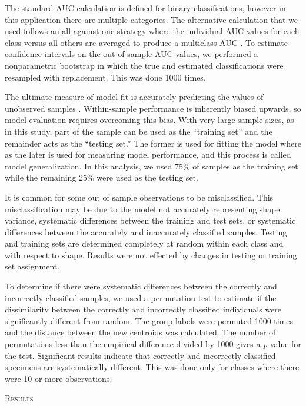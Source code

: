 \documentclass[12pt,letterpaper]{article}
\renewcommand{\section}[1]{%
\bigskip
\begin{center}
\begin{Large}
\normalfont\scshape #1
\medskip
\end{Large}
\end{center}}
\begin{document}
The standard AUC calculation is defined for binary classifications, however in this application there are multiple categories. The alternative calculation that we used follows an all-against-one strategy where the individual AUC values for each class versus all others are averaged to produce a multiclass AUC \citep{Hand2001}. To estimate confidence intervals on the out-of-sample AUC values, we performed a nonparametric bootstrap in which the true and estimated classifications were resampled with replacement. This was done 1000 times.

The ultimate measure of model fit is accurately predicting the values of unobserved samples \citep{Hastie2009,Kuhn2013}. Within-sample performance is inherently biased upwards, so model evaluation requires overcoming this bias. With very large sample sizes, as in this study, part of the sample can be used as the ``training set'' and the remainder acts as the ``testing set.'' The former is used for fitting the model where as the later is used for measuring model performance, and this process is called model generalization. In this analysis, we used 75\% of samples as the training set while the remaining 25\% were used as the testing set.

It is common for some out of sample observations to be misclassified. This misclassification may be due to the model not accurately representing shape variance, systematic differences between the training and test sets, or systematic differences between the accurately and inaccurately classified samples. Testing and training sets are determined completely at random within each class and with respect to shape. Results were not effected by changes in testing or training set assignment.

To determine if there were systematic differences between the correctly and incorrectly classified samples, we used a permutation test to estimate if the dissimilarity between the correctly and incorrectly classified individuals were significantly different from random. The group labels were permuted 1000 times and the distance between the new centroids was calculated. The number of permutations less than the empirical difference divided by 1000 gives a \textit{p}-value for the test. Significant results indicate that correctly and incorrectly classified specimens are systematically different. This was done only for classes where there were 10 or more observations.



\section{Results}
\end{document}
